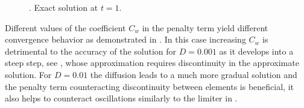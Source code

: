 \begin{example}
\begin{figure}[h]
	\caption{. Exact solution at $t = 1$.}
	\label{fig:burgers_hesthaven_ext}
\end{figure}
Different values of the coefficient $C_w$ in the penalty term yield different convergence
behavior as demonstrated in . In this case increasing $C_w$ is detrimental to the accuracy of the solution for $D=0.001$ as it
develops into a steep step, see , whose approximation
requires discontinuity in the approximate solution. For $D=0.01$ the diffusion leads to a much
more gradual solution and the penalty term counteracting discontinuity between elements
is beneficial, it also helps to counteract oscillations similarly to the limiter in
.
\end{example}
